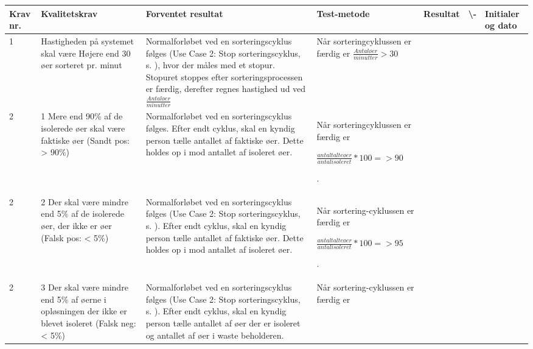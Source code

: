 \begin{center}
		\begin{longtable}{ | m{1.785cm} | m{1.785cm}| m{1.785cm}| m{1.785cm}| m{1.785cm}| m{1.785cm}|m{1.785cm}| } 
			\hline
			\textbf{Krav nr.} &\textbf{ Kvalitetskrav} & \textbf{Forventet resultat} & \textbf{Test-metode} &\textbf{Resultat} & \textbf{ \checkmark \textbackslash -} & \textbf{Initialer og dato} \\ 
			
			\hline
			1 &  Hastigheden på systemet skal være Højere end 30 øer sorteret pr. minut & Normalforløbet ved en sorteringscyklus følges (Use Case 2: Stop sorteringscyklus, s.  \pageref{uc2}), hvor der måles med et stopur. Stopuret stoppes efter sorteringsprocessen er færdig, derefter regnes hastighed ud ved 
$\frac{Antal øer}{minutter}$			
			
			 & Når sorteringcyklussen er færdig er
			$\frac{Antal øer}{minutter}>30$
 &  & & \\
			\hline
			
			2 &  1 Mere end 90\% af de isolerede øer skal være faktiske øer 
(Sandt pos: > 90\%)
 & Normalforløbet ved en sorteringscyklus følges. Efter endt cyklus, skal en kyndig person tælle antallet af faktiske øer. Dette holdes op i mod antallet af isoleret øer. & Når sorteringcyklussen er færdig er

 $\frac{antal talte øer}{antal isoleret}*100=>90$


.   &  & & \\
			\hline
			
			2 &  2 Der skal være mindre end 5\% af de isolerede øer, der ikke er øer
(Falsk pos: < 5\%)
 & Normalforløbet ved en sorteringscyklus følges (Use Case 2: Stop sorteringscyklus, s.  \pageref{uc2}). Efter endt cyklus, skal en kyndig person tælle antallet af faktiske øer. Dette holdes op i mod antallet af isoleret øer.  & Når sortering-cyklussen er færdig er

$\frac{antal talte øer}{antal isoleret}*100=>95$


.   &  & & \\

			\hline
2 &  3 Der skal være mindre end 5\% af øerne i opløsningen der ikke er blevet isoleret
(Falsk neg: < 5\%)

 & Normalforløbet ved en sorteringscyklus følges (Use Case 2: Stop sorteringscyklus, s.  \pageref{uc2}). Efter endt cyklus, skal en kyndig person tælle antallet af øer der er isoleret og antallet af øer i waste beholderen.  & Når sortering-cyklussen er færdig er


\end{longtable}
\end{center}
